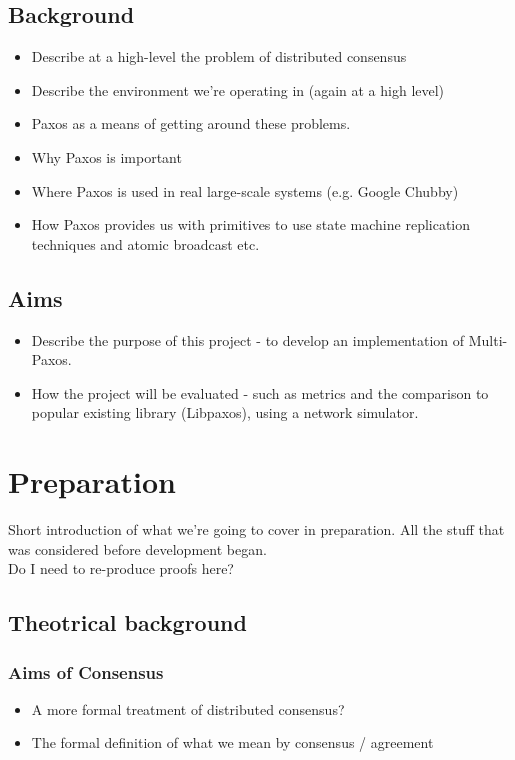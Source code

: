 \documentclass[12pt,twoside,notitlepage]{report}
\begin{document}
\section{Background}

\begin{itemize}
  \item Describe at a high-level the problem of distributed consensus
  \item Describe the environment we're operating in (again at a high level)
  \item Paxos as a means of getting around these problems.
  \item Why Paxos is important
  \item Where Paxos is used in real large-scale systems (e.g. Google Chubby)
  \item How Paxos provides us with primitives to use state machine replication techniques and atomic broadcast etc.
\end{itemize}

\section{Aims}

\begin{itemize}
  \item Describe the purpose of this project - to develop an implementation of Multi-Paxos.
  \item How the project will be evaluated - such as metrics and the comparison to popular existing library (Libpaxos), using a network simulator.
\end{itemize}

\newpage

\chapter{Preparation}

Short introduction of what we're going to cover in preparation. All the stuff that was considered before development began. \\

Do I need to re-produce proofs here?

\section{Theotrical background}

\subsection{Aims of Consensus}
  \begin{itemize}
    \item A more formal treatment of distributed consensus?
    \item The formal definition of what we mean by consensus / agreement
  \end{itemize}
\end{document}

